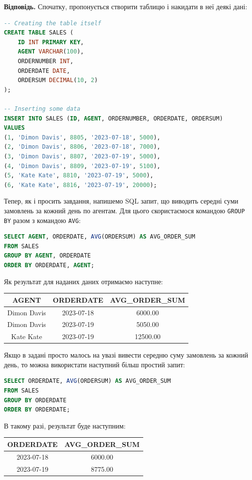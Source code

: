 \documentclass{hw_template}
\begin{document}
\textbf{Відповідь.} Спочатку, пропонується створити таблицю і накидати 
в неї деякі дані:
\begin{lstlisting}[language=SQL]
-- Creating the table itself
CREATE TABLE SALES (
    ID INT PRIMARY KEY,
    AGENT VARCHAR(100),
    ORDERNUMBER INT,
    ORDERDATE DATE,
    ORDERSUM DECIMAL(10, 2)
);

-- Inserting some data
INSERT INTO SALES (ID, AGENT, ORDERNUMBER, ORDERDATE, ORDERSUM)
VALUES
(1, 'Dimon Davis', 8805, '2023-07-18', 5000),
(2, 'Dimon Davis', 8806, '2023-07-18', 7000),
(3, 'Dimon Davis', 8807, '2023-07-19', 5000),
(4, 'Dimon Davis', 8809, '2023-07-19', 5100),
(5, 'Kate Kate', 8810, '2023-07-19', 5000),
(6, 'Kate Kate', 8816, '2023-07-19', 20000);
\end{lstlisting}

Тепер, як і просить завдання, напишемо SQL запит, що виводить середні суми
замовлень за кожний день по агентам. Для цього скористаємося командою 
\texttt{GROUP BY} разом з командою \texttt{AVG}:
\begin{lstlisting}[language=SQL]
SELECT AGENT, ORDERDATE, AVG(ORDERSUM) AS AVG_ORDER_SUM
FROM SALES
GROUP BY AGENT, ORDERDATE
ORDER BY ORDERDATE, AGENT;
\end{lstlisting}

Як результат для наданих даних отримаємо наступне:

\begin{center}
    \begin{tabular}{|c|c|c|}
        \hline
        AGENT & ORDERDATE & AVG\_ORDER\_SUM \\
        \hline
        Dimon Davis & 2023-07-18 & 6000.00 \\
        Dimon Davis & 2023-07-19 & 5050.00 \\
        Kate Kate & 2023-07-19 & 12500.00 \\
        \hline
    \end{tabular}
\end{center}

Якщо в задані просто малось на увазі вивести середню суму замовлень за кожний
день, то можна використати наступний більш простий запит:
\begin{lstlisting}[language=SQL]
SELECT ORDERDATE, AVG(ORDERSUM) AS AVG_ORDER_SUM
FROM SALES
GROUP BY ORDERDATE
ORDER BY ORDERDATE;
\end{lstlisting}

В такому разі, результат буде наступним:

\begin{center}
    \begin{tabular}{|c|c|}
        \hline
        ORDERDATE & AVG\_ORDER\_SUM \\
        \hline
        2023-07-18 & 6000.00 \\
        2023-07-19 & 8775.00 \\
        \hline
    \end{tabular}
\end{center}
\end{document}
